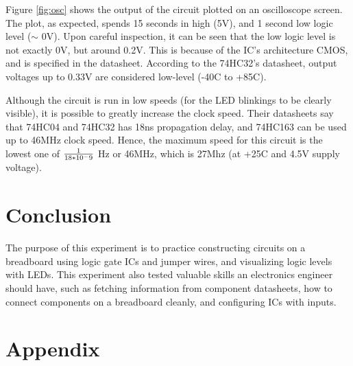 \documentclass[a4paper, 12pt]{article}
\begin{document}
Figure \ref{fig:osc} shows the output of the circuit plotted on an oscilloscope screen.
The plot, as expected, spends 15 seconds in high (5V), and 1 second low logic level ($\sim$ 0V).
Upon careful inspection, it can be seen that the low logic level is not exactly 0V, but around 0.2V.
This is because of the IC's architecture CMOS, and is specified in the datasheet.
According to the 74HC32's datasheet, output voltages up to 0.33V are considered low-level (-40\degree C to +85\degree C).

Although the circuit is run in low speeds (for the LED blinkings to be clearly visible), it is possible to greatly increase the clock speed.
Their datasheets say that 74HC04 and 74HC32 has 18ns propagation delay, and 74HC163 can be used up to 46MHz clock speed.
Hence, the maximum speed for this circuit is the lowest one of $1\over18*10^-9$ Hz or 46MHz, which is 27Mhz (at +25\degree C and 4.5V supply voltage).

\section{Conclusion}

The purpose of this experiment is to practice constructing circuits on a breadboard using logic gate ICs and jumper wires, and visualizing logic levels with LEDs.
This experiment also tested valuable skills an electronics engineer should have, such as fetching information from component datasheets, how to connect components on a breadboard cleanly, and configuring ICs with inputs.

\appendix
\section{Appendix}
\end{document}
